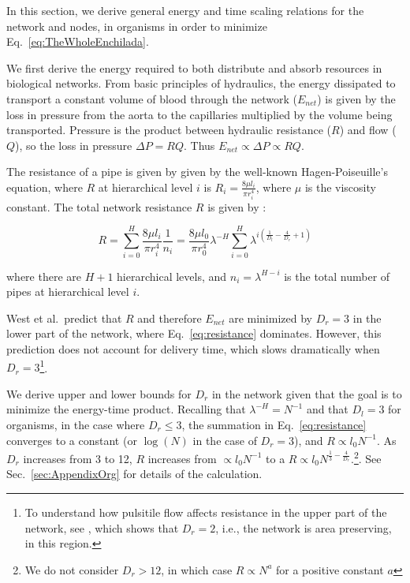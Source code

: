 \documentclass[12pt]{article}
\begin{document}
In this section, we derive general energy and time scaling relations for the
network and nodes, in organisms in order to minimize Eq.~\ref{eq:TheWholeEnchilada}.  

We first derive the energy required to both distribute and absorb resources in
biological networks. From basic principles of hydraulics, the energy dissipated
to transport a constant volume of blood through the network ($E_{net}$) is
given by the loss in pressure from the aorta to the capillaries multiplied by
the volume being transported.  Pressure is the product between hydraulic
resistance ($R$) and flow ($Q$), so the loss in pressure $\Delta P = RQ$.  Thus
$E_{net} \propto \Delta P \propto RQ$.

The resistance of a pipe is given by given by the well-known Hagen-Poiseuille's
equation, where $R$ at hierarchical level $i$ is $R_i = \frac{8\mu l_i}{\pi
r_i^4}$, where $\mu$ is the viscosity constant.  The total network resistance
$R$ is given by \cite{west97}:

\begin{equation}
\label{eq:resistance}
R = \sum_{i=0}^H \frac{8\mu l_i}{\pi r_i^4}\frac{1}{n_i}
= \frac{8\mu l_0}{\pi r_0^4} \lambda^{-H}\sum_{i=0}^H \lambda^{i 
\left(\frac{1}{D_l} - \frac{4}{D_r} + 1 \right)}
\end{equation}

\noindent where there are $H+1$ hierarchical levels, and $n_i = \lambda^{H-i}$
is the total number of pipes at hierarchical level $i$.  

West et al.\ predict that $R$ and therefore $E_{net}$ are minimized by $D_r =
3$ in the lower part of the network,  where Eq.~\ref{eq:resistance} dominates.
However, this prediction does not account for delivery time, which slows
dramatically when $D_r = 3$\footnote{To understand how pulsitile flow affects
resistance in the upper part of the network, see \cite{west97}, which shows
that $D_r = 2$, i.e., the network is area preserving, in this region.}.

We derive upper and lower bounds for $D_r$ in the network given that the goal
is to minimize the energy-time product.  Recalling that $\lambda^{-H} = N^{-1}$
and that $D_l = 3$ for organisms, in the case where $D_r \leq 3$, the summation
in Eq.~\ref{eq:resistance} converges to a constant (or $\log(N)$ in the case of
$D_r=3$), and $R \propto l_0 N^{-1}$. As $D_r$ increases from 3 to 12, $R$
increases from $\propto l_0 N^{-1}$ to a $R \propto l_0 N^{\frac{1}{3} -
\frac{4}{D_r}}$.\footnote{We do not consider $D_r > 12$, in which case $R
\propto N^a$ for a positive constant $a$}. See Sec.~\ref{sec:AppendixOrg} for
details of the calculation.
\end{document}
